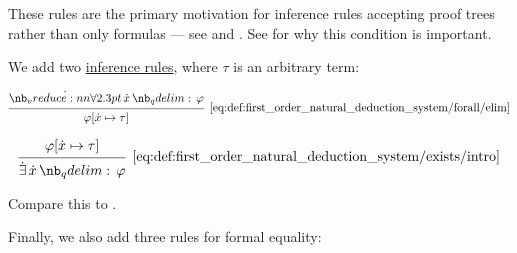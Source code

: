 \begin{definition}
\begin{thmenum}
    These rules are the primary motivation for inference rules accepting proof trees rather than only formulas --- see  and . See  for why this condition is important.

     We add two \hyperref[con:judgment/inference_rule]{inference rules}, where \( \tau \) is an arbitrary term:

    \begin{minipage}{0.45\textwidth}
      \begin{equation*}\taglabel[\( \synforall^- \)]{eq:def:first_order_natural_deduction_system/forall/elim}
        \begin{prooftree}
          \hypo{ \qforall \synx \varphi }
          \infer1[\ref{eq:def:first_order_natural_deduction_system/forall/elim}]{ \varphi[\synx \mapsto \tau] }
        \end{prooftree}
      \end{equation*}
    \end{minipage}
    \hfill
    \begin{minipage}{0.45\textwidth}
      \begin{equation*}\taglabel[\( \synexists^+ \)]{eq:def:first_order_natural_deduction_system/exists/intro}
        \begin{prooftree}
          \hypo{ \varphi[\synx \mapsto \tau] }
          \infer1[\ref{eq:def:first_order_natural_deduction_system/exists/intro}]{ \qexists \synx \varphi }
        \end{prooftree}
      \end{equation*}
    \end{minipage}

    Compare this to .

     Finally, we also add three rules for formal equality:


\end{thmenum}
\end{definition}
